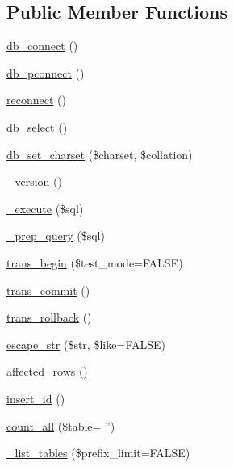 \subsection*{Public Member Functions}
\begin{DoxyCompactItemize}
\item 
\hyperlink{class_c_i___d_b__mysql__driver_a6aa545dcb7768f0b62d37cdcf7f09adc}{db\-\_\-connect} ()
\item 
\hyperlink{class_c_i___d_b__mysql__driver_a0f69e662bd02de5bcf98647068e7c653}{db\-\_\-pconnect} ()
\item 
\hyperlink{class_c_i___d_b__mysql__driver_a57c19c642ab3023e28d10c50f86ff0a8}{reconnect} ()
\item 
\hyperlink{class_c_i___d_b__mysql__driver_af0c7f2602586ea2050b19fb36baefb24}{db\-\_\-select} ()
\item 
\hyperlink{class_c_i___d_b__mysql__driver_adc8cd12121dc8edda3adcadd88a97e24}{db\-\_\-set\-\_\-charset} (\$charset, \$collation)
\item 
\hyperlink{class_c_i___d_b__mysql__driver_ac997a462bb342f97f414910f0e033fb6}{\-\_\-version} ()
\item 
\hyperlink{class_c_i___d_b__mysql__driver_a114ab675d89bf8324a41785fb475e86d}{\-\_\-execute} (\$sql)
\item 
\hyperlink{class_c_i___d_b__mysql__driver_a86af88ef0fa6d44ab4691e3f53270339}{\-\_\-prep\-\_\-query} (\$sql)
\item 
\hyperlink{class_c_i___d_b__mysql__driver_a90e153cf190d273336d77cce930587e1}{trans\-\_\-begin} (\$test\-\_\-mode=F\-A\-L\-S\-E)
\item 
\hyperlink{class_c_i___d_b__mysql__driver_af4fbdcdace4aa94a139b64877601fe9b}{trans\-\_\-commit} ()
\item 
\hyperlink{class_c_i___d_b__mysql__driver_a53f76d4dfcd6ac04fb653982442aeef8}{trans\-\_\-rollback} ()
\item 
\hyperlink{class_c_i___d_b__mysql__driver_aaba16891c8c93600a87075800cc5b72b}{escape\-\_\-str} (\$str, \$like=F\-A\-L\-S\-E)
\item 
\hyperlink{class_c_i___d_b__mysql__driver_a77248aaad33eb132c04cc4aa3f4bc8cb}{affected\-\_\-rows} ()
\item 
\hyperlink{class_c_i___d_b__mysql__driver_a933f2cde8dc7f87875e257d0a4902e99}{insert\-\_\-id} ()
\item 
\hyperlink{class_c_i___d_b__mysql__driver_a66111c61856499b091af32502978d4fc}{count\-\_\-all} (\$table= '')
\item 
\hyperlink{class_c_i___d_b__mysql__driver_a435c0f3ce54fe7daa178baa8532ebd54}{\-\_\-list\-\_\-tables} (\$prefix\-\_\-limit=F\-A\-L\-S\-E)

\end{DoxyCompactItemize}
